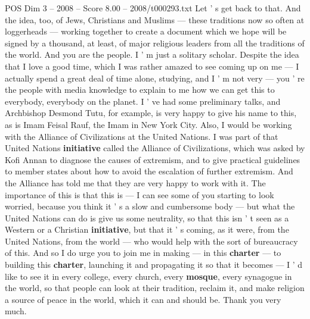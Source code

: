 \begin{textsample}{POS Dim 3 – 2008 – Score 8.00 – 2008/t000293.txt}
Let ' s get back to that.
And the idea, too, of Jews, Christians and Muslims — these traditions now so often at loggerheads — working together to create a document which we hope will be signed by a thousand, at least, of major religious leaders from all the traditions of the world.
And you are the people.
I ' m just a solitary scholar.
Despite the idea that I love a good time, which I was rather amazed to see coming up on me — I actually spend a great deal of time alone, studying, and I ' m not very — you ' re the people with media knowledge to explain to me how we can get this to everybody, everybody on the planet.
I ' ve had some preliminary talks, and Archbishop Desmond Tutu, for example, is very happy to give his name to this, as is Imam Feisal Rauf, the Imam in New York City.
Also, I would be working with the Alliance of Civilizations at the United Nations.
I was part of that United Nations \textbf{initiative} called the Alliance of Civilizations, which was asked by Kofi Annan to diagnose the causes of extremism, and to give practical guidelines to member states about how to avoid the escalation of further extremism.
And the Alliance has told me that they are very happy to work with it.
The importance of this is that this is — I can see some of you starting to look worried, because you think it ' s a slow and cumbersome body — but what the United Nations can do is give us some neutrality, so that this isn ' t seen as a Western or a Christian \textbf{initiative}, but that it ' s coming, as it were, from the United Nations, from the world — who would help with the sort of bureaucracy of this.
And so I do urge you to join me in making — in this \textbf{charter} — to building this \textbf{charter}, launching it and propagating it so that it becomes — I ' d like to see it in every college, every church, every \textbf{mosque}, every synagogue in the world, so that people can look at their tradition, reclaim it, and make religion a source of peace in the world, which it can and should be.
Thank you very much.

\end{textsample}
